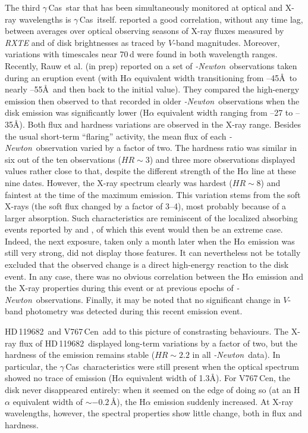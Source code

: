 \documentclass[a4paper,fleqn,usenatbib]{mnras}
\newcommand{\xmm}{{\sc{XMM}}\emph{-Newton}}
\newcommand{\gc}{$\gamma$\,Cas}
\newcommand{\hd}{HD\,119682}
\newcommand{\vc}{V767\,Cen}
\begin{document}
The third \gc\ star that has been simultaneously monitored at optical and X-ray wavelengths is \gc\ itself. \citet{mot15} reported a good correlation, without any time lag, between averages over optical observing seasons of X-ray fluxes measured by {\it RXTE} and of disk brightnesses as traced by $V$-band magnitudes. Moreover, variations with timescales near 70\,d were found in both wavelength ranges. Recently, Rauw et al. (in prep) reported on a set of \xmm\ observations taken during an eruption event (with H$\alpha$ equivalent width transitioning from --45\AA\ to nearly --55\AA\ and then back to the initial value). They compared the high-energy emission then observed to that recorded in older \xmm\ observations when the disk emission was significantly lower (H$\alpha$ equivalent width ranging from --27 to --35\AA). Both flux and hardness variations are observed in the X-ray range. Besides the usual short-term ``flaring'' activity, the mean flux of each \xmm\ observation varied by a factor of two. The hardness ratio was similar in six out of the ten observations ($HR\sim 3$) and three more observations displayed values rather close to that, despite the different strength of the H$\alpha$ line at these nine dates. However, the X-ray spectrum clearly was hardest ($HR\sim 8$) and faintest at the time of the maximum emission. This variation stems from the soft X-rays (the soft flux changed by a factor of 3--4), most probably because of a larger absorption. Such characteristics are reminiscent of the localized absorbing events reported by \citet{ham16} and \citet{smi19}, of which this event would then be an extreme case. Indeed, the next exposure, taken only a month later when the H$\alpha$ emission was still very strong, did not display those features. It can nevertheless not be totally excluded that the observed change is a direct high-energy reaction to the disk event. In any case, there was no obvious correlation between the H$\alpha$ emission and the X-ray properties during this event or at previous epochs of \xmm\ observations. Finally, it may be noted that no significant change in $V$-band photometry was detected during this recent emission event.

\hd\ and \vc\ add to this picture of constrasting behaviours. The X-ray flux of \hd\ displayed long-term variations by a factor of two, but the hardness of the emission remains stable ($HR\sim2.2$ in all \xmm\ data). In particular, the \gc\ characteristics were still present when the optical spectrum showed no trace of emission (H$\alpha$ equivalent width of 1.3\AA). For \vc, the disk never disappeared entirely: when it seemed on the edge of doing so (at an H$\alpha$ equivalent width of $\sim-0.2$\,\AA), the H$\alpha$ emission suddenly increased. At X-ray wavelengths, however, the spectral properties show little change, both in flux and hardness. 
\end{document}
